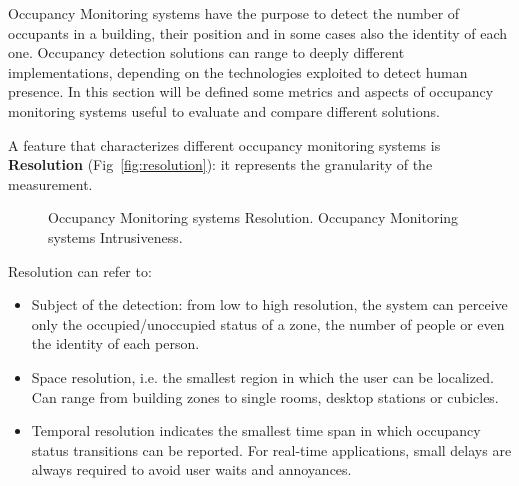 Occupancy Monitoring systems have the purpose to detect the number of occupants in a building, their position and in some cases also the identity of each one.
Occupancy detection solutions can range to deeply different implementations, depending on the technologies exploited to detect human presence. In this section will be defined some metrics and aspects of occupancy monitoring systems useful to evaluate and compare different solutions.

\medskip
A feature that characterizes different occupancy monitoring systems is \textbf{Resolution} (Fig~\ref{fig:resolution}): it represents the granularity of the measurement.

\begin{figure}
     \centering
     \caption[Occupancy Monitoring systems Resolution and Intrusiveness.]{\protect{} Occupancy Monitoring systems Resolution. \protect{} Occupancy Monitoring systems Intrusiveness.}
	\label{fig:res_intr}
\end{figure}


Resolution can refer to:
\begin{itemize}
\item Subject of the detection: from low to high resolution, the system can perceive only the occupied/unoccupied status of a zone, the number of people or even the identity of each person.
\item Space resolution, i.e. the smallest region in which the user can be localized. Can range from building zones to single rooms, desktop stations or cubicles.
\item Temporal resolution indicates the smallest time span in which occupancy status transitions can be reported. For real-time applications, small delays are always required to avoid user waits and annoyances.
\end{itemize}

